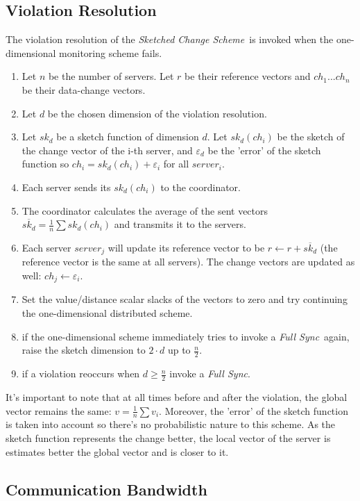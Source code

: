 \documentclass[10pt, conference]{IEEEtran}
\newcommand{\sketchScheme}{\textit{Sketched Change Scheme}}
\newcommand{\fullSync}{\textit{Full Sync}}
\begin{document}
\subsection{Violation Resolution}
The violation resolution of the \sketchScheme \ is invoked when the one-dimensional monitoring scheme fails. 
\begin{enumerate}
\item Let $n$ be the number of servers. Let $r$ be their reference vectors and $ch_1 ... ch_n$ be their data-change vectors.
\item Let $d$ be the chosen dimension of the violation resolution.
\item Let $sk_d$ be a sketch function of dimension $d$. Let $sk_d (ch_i)$ be the sketch of the change vector of the i-th server, and $\varepsilon _d$ be the 'error' of the sketch function so ${ch_i = sk_d(ch_i) + \varepsilon _i}$ for all $server_i$.
\item Each server sends its $sk_d(ch_i)$ to the coordinator.
\item The coordinator calculates the average of the sent vectors ${\overline{sk_d} = \frac{1}{n}\sum sk_d(ch_i)}$ and transmits it to the servers.
\item Each server $server_j$ will update its reference vector to be ${r \leftarrow r + \overline{sk_d}}$ (the reference vector is the same at all servers). The change vectors are updated as well: ${ch_j \leftarrow \varepsilon _i}$.
\item Set the value/distance scalar slacks of the vectors to zero and try continuing the one-dimensional distributed scheme.
\item if the one-dimensional scheme immediately tries to invoke a \fullSync \ again, raise the sketch dimension to $2\cdot d$ up to $\frac{n}{2}$.
\item if a violation reoccurs when ${d \geq \frac{n}{2}}$ invoke a \fullSync .
\end{enumerate} 
It's important to note that at all times before and after the violation, the global vector remains the same: ${v = \frac{1}{n}\sum v_i}$. Moreover, the 'error' of the sketch function is taken into account so there's no probabilistic nature to this scheme. As the sketch function represents the change better, the local vector of the server is estimates better the global vector and is closer to it.
\subsection{Communication Bandwidth}
\end{document}
